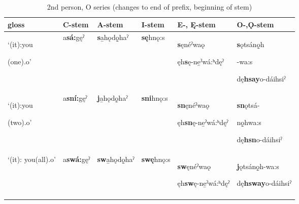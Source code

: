 \begin{table}
\caption{2nd person, O series (changes to end of prefix, beginning of stem)}
\label{tab:1:2ppron2}
\tiny{
\begin{tabularx}{\textwidth}{XXXXXX}
\lsptoprule
gloss & C-stem & A-stem & I-stem & E-, Ę{}-stem & O-,Ǫ{}-stem\\
\midrule
‘(it):you

(one).o’ & a\textbf{sá:}gęˀ & \textbf{s}a̱hǫdǫ̱haˀ & \textbf{sę}hnǫ:s & \textbf{s}ęnéˀwaǫ

ęh\textbf{s}ę-ne̱ˀwá:ʰdęˀ & \textbf{s}ǫtsánǫ̱h

-wa:s

dę\textbf{hsay}o-dáihsiˀ\\
‘(it):you

(two).o’ & a\textbf{sní:}gęˀ & \textbf{j}a̱hǫdǫ̱haˀ & \textbf{sni}hnǫ:s & \textbf{sn}ęnéˀwaǫ

ęh\textbf{sn}ę-ne̱ˀwá:ʰdęˀ & \textbf{sn}ǫtsá-

nǫ̱hwa:s

dę\textbf{hsn}o-dáihsiˀ\\
‘(it): you(all).o’ & a\textbf{swá:}gęˀ & \textbf{sw}a̱hǫdǫ̱haˀ & \textbf{swę}hnǫ:s & \textbf{sw}ęnéˀwaǫ

ęh\textbf{sw}ę-ne̱ˀwá:ʰdęˀ & \textbf{j}ǫtsánǫ̱h-wa:s

dę\textbf{hsway}o-dáihsiˀ\\
\lspbottomrule
\end{tabularx}}
\end{table}


